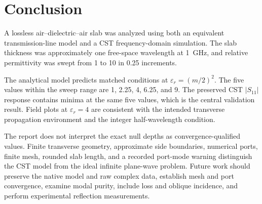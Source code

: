 \section{Conclusion}
\label{sec:conclusion}

A lossless air--dielectric--air slab was analyzed using both an equivalent
transmission-line model and a CST frequency-domain simulation. The slab thickness was
approximately one free-space wavelength at 1~GHz, and relative permittivity was swept
from 1 to 10 in 0.25 increments.

The analytical model predicts matched conditions at
$\varepsilon_r=(m/2)^2$. The five values within the sweep range are 1, 2.25, 4, 6.25,
and 9. The preserved CST $|S_{11}|$ response contains minima at the same five values,
which is the central validation result. Field plots at $\varepsilon_r=4$ are consistent
with the intended transverse propagation environment and the integer half-wavelength
condition.

The report does not interpret the exact null depths as convergence-qualified values.
Finite transverse geometry, approximate side boundaries, numerical ports, finite mesh,
rounded slab length, and a recorded port-mode warning distinguish the CST model from
the ideal infinite plane-wave problem. Future work should preserve the native model and
raw complex data, establish mesh and port convergence, examine modal purity, include
loss and oblique incidence, and perform experimental reflection measurements.

